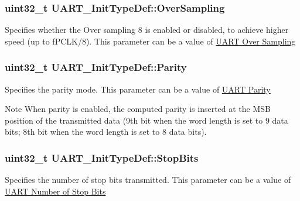 \subsubsection[{\texorpdfstring{Over\+Sampling}{OverSampling}}]{\setlength{\rightskip}{0pt plus 5cm}uint32\+\_\+t U\+A\+R\+T\+\_\+\+Init\+Type\+Def\+::\+Over\+Sampling}\hypertarget{struct_u_a_r_t___init_type_def_a77c2c86a2186e09cbf022e27c0c82324}{}\label{struct_u_a_r_t___init_type_def_a77c2c86a2186e09cbf022e27c0c82324}
Specifies whether the Over sampling 8 is enabled or disabled, to achieve higher speed (up to f\+P\+C\+L\+K/8). This parameter can be a value of \hyperlink{group___u_a_r_t___over___sampling}{U\+A\+RT Over Sampling} 
\subsubsection[{\texorpdfstring{Parity}{Parity}}]{\setlength{\rightskip}{0pt plus 5cm}uint32\+\_\+t U\+A\+R\+T\+\_\+\+Init\+Type\+Def\+::\+Parity}\hypertarget{struct_u_a_r_t___init_type_def_adc92243425cb18cb8b5f03692841db48}{}\label{struct_u_a_r_t___init_type_def_adc92243425cb18cb8b5f03692841db48}
Specifies the parity mode. This parameter can be a value of \hyperlink{group___u_a_r_t___parity}{U\+A\+RT Parity} \begin{DoxyNote}{Note}
When parity is enabled, the computed parity is inserted at the M\+SB position of the transmitted data (9th bit when the word length is set to 9 data bits; 8th bit when the word length is set to 8 data bits). 
\end{DoxyNote}
\subsubsection[{\texorpdfstring{Stop\+Bits}{StopBits}}]{\setlength{\rightskip}{0pt plus 5cm}uint32\+\_\+t U\+A\+R\+T\+\_\+\+Init\+Type\+Def\+::\+Stop\+Bits}\hypertarget{struct_u_a_r_t___init_type_def_a6717dfe595617c7b2d57139d9cd306ef}{}\label{struct_u_a_r_t___init_type_def_a6717dfe595617c7b2d57139d9cd306ef}
Specifies the number of stop bits transmitted. This parameter can be a value of \hyperlink{group___u_a_r_t___stop___bits}{U\+A\+RT Number of Stop Bits} 
